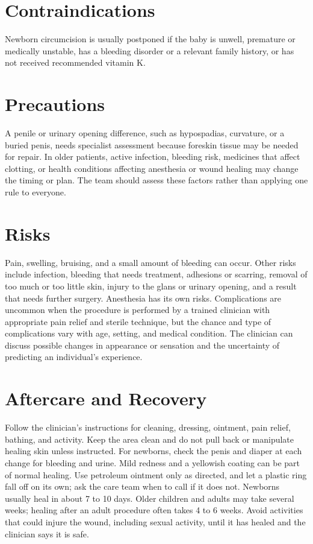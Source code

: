 \section*{Contraindications}
Newborn circumcision is usually postponed if the baby is unwell, premature or medically unstable, has a bleeding disorder or a relevant family history, or has not received recommended vitamin K.

\section*{Precautions}
A penile or urinary opening difference, such as hypospadias, curvature, or a buried penis, needs specialist assessment because foreskin tissue may be needed for repair. In older patients, active infection, bleeding risk, medicines that affect clotting, or health conditions affecting anesthesia or wound healing may change the timing or plan. The team should assess these factors rather than applying one rule to everyone.

\section*{Risks}
Pain, swelling, bruising, and a small amount of bleeding can occur. Other risks include infection, bleeding that needs treatment, adhesions or scarring, removal of too much or too little skin, injury to the glans or urinary opening, and a result that needs further surgery. Anesthesia has its own risks. Complications are uncommon when the procedure is performed by a trained clinician with appropriate pain relief and sterile technique, but the chance and type of complications vary with age, setting, and medical condition. The clinician can discuss possible changes in appearance or sensation and the uncertainty of predicting an individual's experience.

\section*{Aftercare and Recovery}
Follow the clinician's instructions for cleaning, dressing, ointment, pain relief, bathing, and activity. Keep the area clean and do not pull back or manipulate healing skin unless instructed. For newborns, check the penis and diaper at each change for bleeding and urine. Mild redness and a yellowish coating can be part of normal healing. Use petroleum ointment only as directed, and let a plastic ring fall off on its own; ask the care team when to call if it does not. Newborns usually heal in about 7 to 10 days. Older children and adults may take several weeks; healing after an adult procedure often takes 4 to 6 weeks. Avoid activities that could injure the wound, including sexual activity, until it has healed and the clinician says it is safe.

